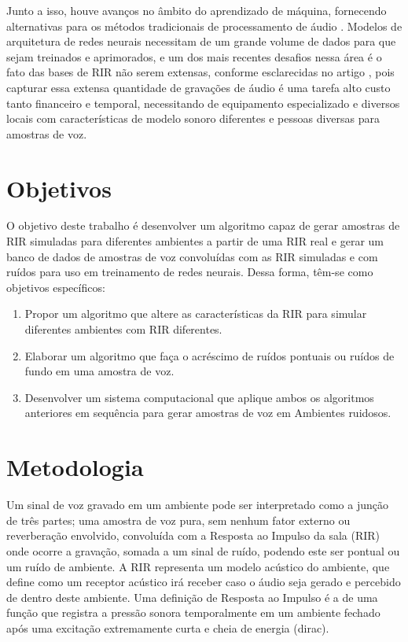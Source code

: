Junto a isso, houve avanços no âmbito do aprendizado de máquina, fornecendo alternativas para os métodos tradicionais
de processamento de áudio \cite{ML_Speech_Rec}.
Modelos de arquitetura de redes neurais necessitam de um grande volume de dados para que sejam treinados e aprimorados, e um dos mais recentes
desafios nessa área é o fato das bases de RIR não serem extensas, conforme esclarecidas no artigo \cite{Estimation_RT_DRR},
pois capturar essa extensa quantidade de gravações de áudio é uma tarefa alto custo tanto financeiro e temporal, necessitando de equipamento especializado
e diversos locais com características de modelo sonoro diferentes e pessoas diversas para amostras de voz.


\section{Objetivos}

O objetivo deste trabalho é desenvolver um algoritmo capaz de gerar amostras de RIR simuladas para diferentes ambientes a partir de uma RIR real e
gerar um banco de dados de amostras de voz convoluídas com as RIR simuladas e com ruídos para uso em treinamento de redes neurais.
Dessa forma, têm-se como objetivos específicos:

\begin{enumerate}
      \item Propor um algoritmo que altere as características da RIR para simular diferentes ambientes com RIR diferentes.
      \item Elaborar um algoritmo que faça o acréscimo de ruídos pontuais ou ruídos de fundo em uma amostra de voz.
      \item Desenvolver um sistema computacional que aplique ambos os algoritmos anteriores em sequência para gerar
      amostras de voz em Ambientes ruidosos.
\end{enumerate}


\section{Metodologia}

Um sinal de voz gravado em um ambiente pode ser interpretado como a junção de três partes; uma amostra de voz pura, sem nenhum fator externo
ou reverberação envolvido, convoluída com a Resposta ao Impulso da sala (RIR) onde ocorre a gravação, somada a um sinal de ruído, podendo este 
ser pontual ou um ruído de ambiente. A RIR representa um modelo acústico do ambiente, que define como um receptor acústico irá receber caso o áudio
seja gerado e percebido de dentro deste ambiente. Uma definição de Resposta ao Impulso é a de uma função que registra a pressão sonora temporalmente
em um ambiente fechado após uma excitação extremamente curta e cheia de energia (dirac).

